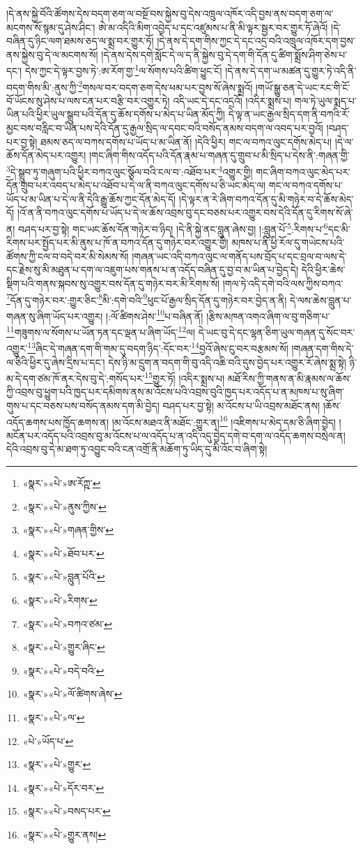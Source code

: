 །དེ་ནས་སྐྱེ་བོའི་ཚོགས་དེས་བདག་ཅག་ལ་བསྔོ་བས་སྐྱེས་བུ་དེས་འཁྲུལ་འཁོར་འདི་བྱས་ནས་བདག་ཅག་ལ་མངགས་སོ་སྙམ་དུ་ཤེས་ཤིང་། ཨེ་མ་འདིའི་མིག་འབྱེད་པ་དང་འཛུམས་པ་ནི་མི་ལྟར་སྦྱར་བར་གྱུར་ཏོ་ཞེའོ། །དེ་བཞིན་དུ་ཉིང་ལག་ཐམས་ཅད་ལ་སྨྲ་བར་གྱུར་ཏོ། །དེ་ནས་དེ་དག་གིས་ཀྱང་དེ་དང་འདྲ་བའི་འཁྲུལ་འཁོར་དག་བྱས་ནས་སྐྱེས་བུ་དེ་ལ་མངགས་སོ། །དེ་ནས་དེས་དགེ་སློང་དེ་ལ་ད་ནི་སྐྱེས་བུ་དེ་དག་གི་དོན་དུ་ཚིག་སྨྲོས་ཤིག་ཅེས་པ་དང་། དེས་ཀྱང་དེ་ལྟར་བྱས་ཏེ་:ཨ་རོག་གྱ་\footnote{«སྣར་»«པེ་»ཨ་རོཀྵ་}ལ་སོགས་པའི་ཚིག་ཕྱུང་ངོ། །དེ་ནས་དེ་དག་ཡ་མཚན་དུ་གྱུར་ཏེ་འདི་ནི་བདག་གིས་མི་:ནུས་ཀྱི་\footnote{«སྣར་»«པེ་»ནུས་ཀྱིས་}གསལ་བར་བདག་ཅག་དེས་ཕམ་པར་བྱས་སོ་ཞེས་སྨྲའོ། །གཡོ་སྒྱུ་ཅན་དེ་ཡང་རང་གི་ངོ་བོ་ཡོངས་སུ་ཤེས་པ་ལས་ངན་པར་བརྩི་བར་འགྱུར་ཏེ། འདི་ཡང་དེ་དང་འདྲའོ། །འདིར་སྨྲས་པ། གལ་ཏེ་ཡུལ་སྨད་པ་ཡིན་པའི་ཕྱིར་ཡུལ་སྒྲུབ་པའི་དོན་དུ་ཆོས་དགོས་པ་མེད་པ་ཡིན་མོད་ཀྱི། དེ་ལྟ་ན་ཡང་རྒྱལ་སྲིད་དག་ནི་བཀའི་རོ་མྱང་བས་བརླིང་བ་ཡིན་པས་དེའི་དོན་དུ་རྒྱལ་སྲིད་ལ་དབང་བའི་བསོད་ནམས་བདག་ལ་འབད་པར་བྱའོ། །བཤད་པར་བྱ་སྟེ། ཐམས་ཅད་ལ་བཀས་དགོས་པ་ཡོད་པ་མ་ཡིན་ནོ། །དེའི་ཕྱིར། གང་ལ་བཀའ་ལུང་དགོས་མེད་པ། །དེ་ལ་ཆོས་དོན་མེད་པར་འགྱུར། །གང་ཞིག་གིས་འདོད་པའི་དོན་རྣམ་པ་གཞན་དུ་གྲུབ་པ་མི་སྲིད་པ་དེས་ནི་:གཞན་གྱི་\footnote{«སྣར་»«པེ་»གཞན་གྱིས་}དེ་སྒྲུབ་ཏུ་གཞུག་པའི་ཕྱིར་བཀའ་ལུང་སྩོལ་བའི་ངལ་བ་:འཐོབ་པར་\footnote{«སྣར་»«པེ་»ཐོབ་པར་}འགྱུར་གྱི། གང་ཞིག་བཀའ་ལུང་མེད་པར་དོན་གྲུབ་པར་འབད་པ་མེད་པ་འཐོབ་པ་དེ་ལ་ནི་བཀའ་ལུང་དགོས་པ་ཅི་ཡང་མེད་ལ། གང་ལ་བཀའ་དགོས་པ་ཡོད་པ་མ་ཡིན་པ་དེ་ལ་ནི་དེའི་རྒྱུ་ཆོས་ཀྱང་དོན་མེད་དོ། །དེ་ལྟར་ན་རེ་ཞིག་བཀའ་དོན་དུ་མི་གཉེར་བ་དེ་ཆོས་མེད་དོ། །འོ་ན་ནི་བཀའ་ལུང་དགོས་པ་ཡོད་པ་དེ་ལ་ཆོས་འབྲས་བུ་དང་བཅས་པར་འགྱུར་བས་དེའི་དོན་དུ་རིགས་སོ་ཞེ་ན། བཤད་པར་བྱ་སྟེ། གང་ཡང་ཆོས་དོན་གཉེར་བ་ཉིད། །དེ་ནི་སྐྱེ་ནང་བླུན་ཞེས་བྱ། །:བླུན་པོ་\footnote{«སྣར་»«པེ་»བླུན་པོའི་}:རིགས་པ་\footnote{«སྣར་»«པེ་»རིགས་}དང་མི་རིགས་པར་སྤྱོད་པར་མི་ནུས་པ་ཁོ་ན་བཀའ་དོན་དུ་གཉེར་བར་འགྱུར་གྱི། མཁས་པ་ནི་ཕྱི་རོལ་དུ་གཡེངས་པའི་ཚོགས་ཀྱི་ངལ་བ་བདེ་བར་མི་སེམས་སོ། །གཞན་ཡང་འདི་བཀའ་ལུང་ལ་གནོད་པས་བྲོད་པ་དང་བྲལ་བ་ལས་དེ་དང་རྗེས་སུ་མི་མཐུན་པ་དག་ལ་འཇུག་པས་གནས་པ་ན་འདོད་བཞིན་དུ་བྱ་བ་མ་ཡིན་པ་བྱེད་དེ། དེའི་ཕྱིར་ཆེས་སྡིག་པའི་གནས་སྐབས་སུ་འགྱུར་བས་དོན་དུ་གཉེར་བར་མི་རིགས་སོ། །གལ་ཏེ་འདི་དགེ་བའི་ལས་ཀྱིས་བཀའ་\footnote{«སྣར་»«པེ་»བཀའ་ཙམ་}དོན་དུ་གཉེར་བར་:གྱུར་ཅིང་\footnote{«སྣར་»«པེ་»གྱུར་ཞིང་}མི་:དགེ་བའི་\footnote{«སྣར་»«པེ་»བདེ་བའི་}ཕུང་པོ་རྒྱལ་སྲིད་དོན་དུ་གཉེར་བར་བྱེད་ན་ནི། དེ་ལས་ཆེས་བླུན་པ་གཞན་སུ་ཞིག་ཡོད་པར་འགྱུར། །:ལོ་ཚིགས་ཤེས་\footnote{«སྣར་»«པེ་»ལོ་ཚིགས་ཞེས་}པ་བཞིན་ནོ། །རྩིས་མཁན་འགའ་ཞིག་ལ་བུ་གཅིག་པ་\footnote{«སྣར་»«པེ་»ལ་}གཟུགས་ལ་སོགས་པ་ཡོན་ཏན་དང་ལྡན་པ་ཞིག་ཡོད་\footnote{«པེ་»ཡོད་པ་}ལ། དེ་ཡང་བུ་དེ་དང་ལྷན་ཅིག་ཡུལ་གཞན་དུ་སོང་བར་འགྱུར་\footnote{«སྣར་»«པེ་»གྱུར་}ཞིང་དེ་གཞན་དག་གི་གམ་དུ་བདག་ཉིད་:དོང་བར་\footnote{«སྣར་»«པེ་»དོར་བར་}བྱའོ་ཞེས་ངུ་བར་བརྩམས་སོ། །གཞན་དག་གིས་དེ་ལ་ཅིའི་ཕྱིར་དུ་ཞེས་དྲིས་པ་དང་། དེས་ཉི་མ་དྲུག་ན་བདག་གི་བུ་འདི་འཆི་བའི་དུས་བྱེད་པར་འགྱུར་རོ་ཞེས་སྨྲ་སྟེ། ཉི་མ་དེ་དག་ཙམ་ཁོ་ནར་དེས་བུ་དེ་:གསོད་པར་\footnote{«སྣར་»«པེ་»བསད་པར་}གྱུར་ཏོ། །འདིར་སྨྲས་པ། མཐོ་རིས་ཀྱི་གནས་ན་མི་རྣམས་ལ་ཆོས་ཀྱི་འབྲས་བུ་ཕྱུག་པའི་ཁྱད་པར་དམིགས་ནས་མ་འོངས་པའི་འབྲས་བུའི་ཁྱད་པར་འདོད་པ་ན་མཁས་པ་སུ་ཞིག་གུས་པ་དང་བཅས་པས་བསོད་ནམས་དག་མི་བྱེད། བཤད་པར་བྱ་སྟེ། མ་འོངས་པ་ཡི་འབྲས་མཐོང་ནས། །ཆོས་འདོད་ཆགས་པས་ཁྱོད་ཆགས་ན། །མ་འོངས་མཐའ་ནི་མཐོང་:གྱུར་ན།\footnote{«སྣར་»«པེ་»གྱུར་ནས།} །འཇིགས་པ་མེད་དམ་ཅི་ཞིག་བྱེད། །མངོན་པར་འདོད་པའི་འབྲས་བུ་མ་འོངས་པ་ལ་འདོད་པ་ན་འདི་འདུ་བྱེད་དགེ་བ་དག་ལ་འདོད་ཆགས་བསྲེལ་ན། དེའི་འབྲས་བུ་དེ་མ་ཐག་ཏུ་འབྱུང་བའི་ངན་འགྲོ་ནི་མཆོག་ཏུ་ཡིད་དུ་མི་འོང་བ་ཞིག་སྟེ། 